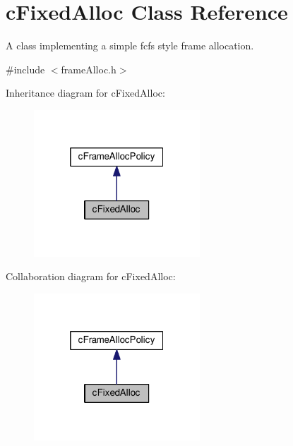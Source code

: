 \hypertarget{classcFixedAlloc}{\section{c\-Fixed\-Alloc \-Class \-Reference}
\label{d1/d40/classcFixedAlloc}
}


\-A class implementing a simple fcfs style frame allocation.  




{\ttfamily \#include $<$frame\-Alloc.\-h$>$}



\-Inheritance diagram for c\-Fixed\-Alloc\-:\nopagebreak
\begin{figure}[H]
\begin{center}
\leavevmode
\includegraphics[width=176pt]{dc/d13/classcFixedAlloc__inherit__graph}
\end{center}
\end{figure}


\-Collaboration diagram for c\-Fixed\-Alloc\-:\nopagebreak
\begin{figure}[H]
\begin{center}
\leavevmode
\includegraphics[width=176pt]{d4/d27/classcFixedAlloc__coll__graph}
\end{center}
\end{figure}
